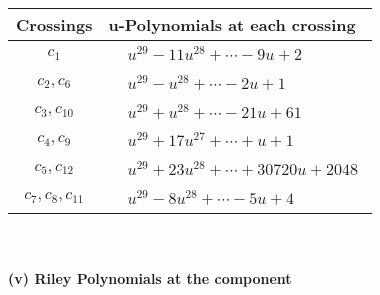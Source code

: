 \documentclass[1p]{elsarticle_modified}
\theoremstyle{definition}
\begin{document}
\begin{tabular}{m{50pt}|m{274pt}}
Crossings & \hspace{64pt}u-Polynomials at each crossing \\
\hline $$\begin{aligned}c_{1}\end{aligned}$$&$\begin{aligned}
&u^{29}-11 u^{28}+\cdots-9 u+2
\end{aligned}$\\
\hline $$\begin{aligned}c_{2},c_{6}\end{aligned}$$&$\begin{aligned}
&u^{29}- u^{28}+\cdots-2 u+1
\end{aligned}$\\
\hline $$\begin{aligned}c_{3},c_{10}\end{aligned}$$&$\begin{aligned}
&u^{29}+u^{28}+\cdots-21 u+61
\end{aligned}$\\
\hline $$\begin{aligned}c_{4},c_{9}\end{aligned}$$&$\begin{aligned}
&u^{29}+17 u^{27}+\cdots+u+1
\end{aligned}$\\
\hline $$\begin{aligned}c_{5},c_{12}\end{aligned}$$&$\begin{aligned}
&u^{29}+23 u^{28}+\cdots+30720 u+2048
\end{aligned}$\\
\hline $$\begin{aligned}c_{7},c_{8},c_{11}\end{aligned}$$&$\begin{aligned}
&u^{29}-8 u^{28}+\cdots-5 u+4
\end{aligned}$\\
\hline
\end{tabular}\\~\\
\newpage\renewcommand{\arraystretch}{1}
\flushleft \textbf{(v) Riley Polynomials at the component}\newline \\
\end{document}
